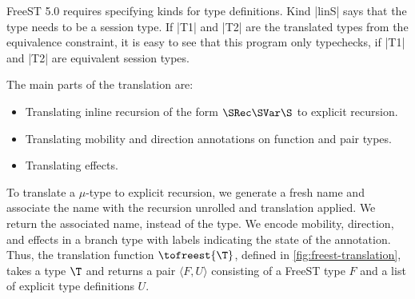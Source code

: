 \noindent FreeST 5.0 requires specifying kinds for type definitions.
Kind |linS| says that the type needs to be a session type.
If |T1| and |T2| are the translated types from the equivalence constraint,
it is easy to see that this program only typechecks, if |T1| and
|T2| are equivalent session types.

The main parts of the translation are:
\begin{itemize}
  \item Translating inline recursion of the form $\SRec\SVar\S$ to explicit recursion.
  \item Translating mobility and direction annotations on function and pair
    types.
  \item Translating effects.
\end{itemize}

To translate a $\mu$-type to explicit recursion, we generate a fresh name and
associate the name with the recursion unrolled and translation applied.
We return the associated name, instead of the type.
We encode mobility, direction, and effects in a branch type with labels
indicating the state of the annotation.
Thus, the translation function $\tofreest{\T}$, defined in
\cref{fig:freest-translation}, takes a type $\T$ and returns a pair
$\langle F,U\rangle$ consisting of a FreeST type $F$ and a list of explicit
type definitions $U$.

